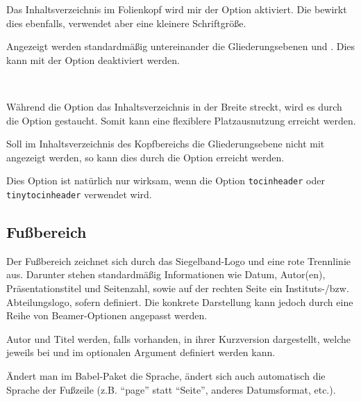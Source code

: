 Das Inhaltsverzeichnis im Folienkopf
wird mir der Option  aktiviert.
Die  bewirkt dies ebenfalls,
verwendet aber eine kleinere Schriftgröße.

Angezeigt werden standardmäßig untereinander die Gliederungsebenen
 und . Dies kann mit der Option
 deaktiviert werden.


\begin{Declaration}
  \\
\end{Declaration}

Während die Option  das Inhaltsverzeichnis in der Breite
streckt, wird es durch die Option  gestaucht.
Somit kann eine flexiblere Platzausnutzung erreicht werden.

\begin{Declaration}
\end{Declaration}

Soll im Inhaltsverzeichnis des Kopfbereichs die Gliederungsebene
 nicht mit angezeigt werden, so kann dies durch die Option
 erreicht werden.

Dies Option ist natürlich nur wirksam, wenn die Option
\lstinline{tocinheader} oder \lstinline{tinytocinheader} verwendet wird.



\subsection{Fußbereich}\label{subsec:foot}

Der Fußbereich zeichnet sich durch das Siegelband-Logo und eine rote Trennlinie
aus. Darunter stehen standardmäßig Informationen wie Datum, Autor(en), Präsentationstitel
und Seitenzahl, sowie auf der rechten Seite ein Instituts-/bzw. Abteilungslogo,
sofern definiert.
Die konkrete Darstellung kann jedoch durch eine Reihe von Beamer-Optionen angepasst werden.

Autor und Titel werden, falls vorhanden, in ihrer Kurzversion dargestellt,
welche jeweils bei  und  im optionalen Argument
definiert werden kann.

Ändert man im Babel-Paket die Sprache, ändert sich auch automatisch
die Sprache der Fußzeile (z.B. "`page"' statt "`Seite"', anderes Datumsformat, etc.).

